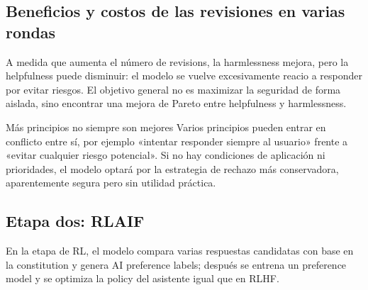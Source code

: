 


\subsection{Beneficios y costos de las revisiones en varias rondas}

A medida que aumenta el número de revisions, la harmlessness mejora, pero la helpfulness puede disminuir: el modelo se vuelve excesivamente reacio a responder por evitar riesgos. El objetivo general no es maximizar la seguridad de forma aislada, sino encontrar una mejora de Pareto entre helpfulness y harmlessness.


\begin{warningbox}{Más principios no siempre son mejores}
Varios principios pueden entrar en conflicto entre sí, por ejemplo «intentar responder siempre al usuario» frente a «evitar cualquier riesgo potencial». Si no hay condiciones de aplicación ni prioridades, el modelo optará por la estrategia de rechazo más conservadora, aparentemente segura pero sin utilidad práctica.
\end{warningbox}

\subsection{Etapa dos: RLAIF}

En la etapa de RL, el modelo compara varias respuestas candidatas con base en la constitution y genera AI preference labels; después se entrena un preference model y se optimiza la policy del asistente igual que en RLHF.


